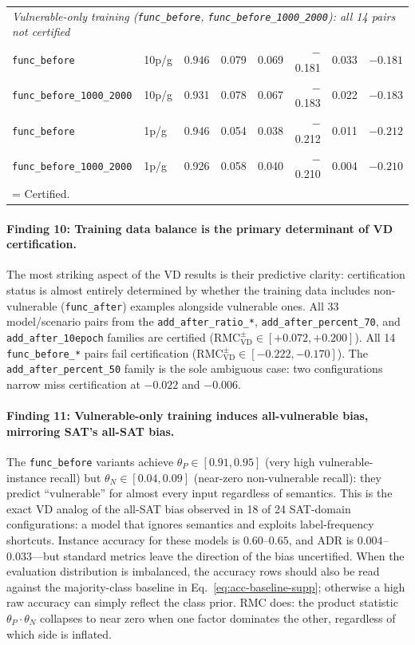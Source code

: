 \documentclass[conference]{IEEEtran}
\theoremstyle{remark}
\newcommand{\RMCVD}{\mathrm{RMC}_{\mathrm{VD}}}
\begin{document}
\begin{table}[t]
{\begin{tabular}{llrrrrrr}
\midrule
\multicolumn{8}{l}{\textit{Vulnerable-only training (\texttt{func\_before}, \texttt{func\_before\_1000\_2000}): all 14 pairs not certified}} \\
\texttt{func\_before}            & 10p/g & 0.946 & 0.079 & 0.069 & $-$0.181 & 0.033 & $-0.181$ \\
\texttt{func\_before\_1000\_2000}& 10p/g & 0.931 & 0.078 & 0.067 & $-$0.183 & 0.022 & $-0.183$ \\
\texttt{func\_before}            & 1p/g  & 0.946 & 0.054 & 0.038 & $-$0.212 & 0.011 & $-0.212$ \\
\texttt{func\_before\_1000\_2000}& 1p/g  & 0.926 & 0.058 & 0.040 & $-$0.210 & 0.004 & $-0.210$ \\
\bottomrule
\multicolumn{8}{l}{\cellcolor{green!10}\phantom{X} = Certified.}
\end{tabular}%
}
\end{table}

\paragraph{Finding 10: Training data balance is the primary determinant of VD certification.}
The most striking aspect of the VD results is their predictive clarity: certification status is almost entirely determined by whether the training data includes non-vulnerable (\texttt{func\_after}) examples alongside vulnerable ones.
All 33 model/scenario pairs from the \texttt{add\_after\_ratio\_*}, \texttt{add\_after\_percent\_70}, and \texttt{add\_after\_10epoch} families are certified ($\RMCVD^{\pm}\in[+0.072, +0.200]$).
All 14 \texttt{func\_before\_*} pairs fail certification ($\RMCVD^{\pm}\in[-0.222, -0.170]$).
The \texttt{add\_after\_percent\_50} family is the sole ambiguous case: two configurations narrow miss certification at $-0.022$ and $-0.006$.

\paragraph{Finding 11: Vulnerable-only training induces all-vulnerable bias, mirroring SAT's all-SAT bias.}
The \texttt{func\_before} variants achieve $\theta_P\in[0.91, 0.95]$ (very high vulnerable-instance recall) but $\theta_N\in[0.04, 0.09]$ (near-zero non-vulnerable recall): they predict ``vulnerable'' for almost every input regardless of semantics.
This is the exact VD analog of the all-SAT bias observed in 18 of 24 SAT-domain configurations: a model that ignores semantics and exploits label-frequency shortcuts.
Instance accuracy for these models is $0.60$--$0.65$, and ADR is $0.004$--$0.033$---but standard metrics leave the direction of the bias uncertified.  When the evaluation distribution is imbalanced, the accuracy rows should also be read against the majority-class baseline in Eq.~\eqref{eq:acc-baseline-supp}; otherwise a high raw accuracy can simply reflect the class prior.
RMC does: the product statistic $\theta_P\cdot\theta_N$ collapses to near zero when one factor dominates the other, regardless of which side is inflated.
\end{document}
